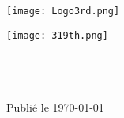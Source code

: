 \thispagestyle{empty}

\begin{center}
	\null
	
	\vfil
	
	\texttt{[image: Logo3rd.png]}
	
	\vfil
	
	
	\vfil
	
	\begin{minipage}{\textwidth}
		\centering
		\texttt{[image: 319th.png]}\\[1ex]
		{\Large \rgt{}}\\[1ex]
		{\Large \inmem{}}\\[2ex]
	\end{minipage}
	
%	
	
	\vfil
	
	
	
	
	
	
	
	\vfil
	
	\begin{minipage}{\textwidth}
		\centering
		{\large \version }\\ %
		{\large Publié le \today}%
	\end{minipage}
	
\end{center}